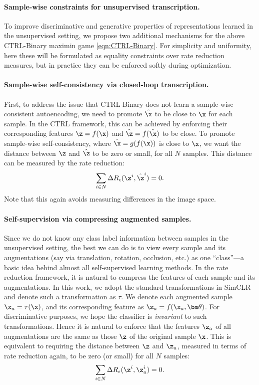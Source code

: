 \documentclass[../../book-main.tex]{subfiles}
\begin{document}
\paragraph{Sample-wise constraints for unsupervised transcription.}
\label{sec:constraints}
To improve discriminative and generative properties of
representations learned in the unsupervised setting, we propose two
additional mechanisms for the above CTRL-Binary maximin game
\eqref{eqn:CTRL-Binary}. For simplicity and uniformity, here these
will be formulated as equality constraints over rate reduction
measures, but in practice they can be enforced softly during optimization.

\paragraph{Sample-wise self-consistency via closed-loop transcription.}
First, to address the issue that CTRL-Binary does not learn a
sample-wise consistent autoencoding, we need to promote $\hat \x$ to
be close to $\x$ for each sample. In the CTRL framework, this can be
achieved by enforcing their corresponding features $\z=f(\x)$ and
$\hat \z = f(\hat \x)$ to be close.
To promote sample-wise self-consistency, where $\hat{\x} = g(f(\x))$
is close to $\x$, we want the distance between $\z$ and $\hat{\z}$
to be zero or small, for all $N$ samples.
This distance can be measured by the rate reduction:
\begin{align}
    \sum_{i\in N} \Delta R_\epsilon(\z^i,\hat{\z}^i) = 0.
    \label{eqn:sample-self-consistency}\vspace{-2mm}
\end{align}
Note that this again avoids measuring differences in the image space.

\paragraph{Self-supervision via compressing augmented samples.}
Since we do not know any class label information between samples in
the unsupervised setting, the best we can do is to view every sample
and its augmentations (say via translation, rotation, occlusion,
etc.) as one ``class''—a basic idea behind almost all self-supervised
learning methods. In the rate reduction framework, it is natural to
compress the features of each sample and its augmentations. In this
work, we adopt the standard transformations in SimCLR
\cite{chen2020simple} and denote such a transformation as $\tau$. We
denote each augmented sample $\x_a = \tau(\x)$, and its corresponding
feature as $\z_a = f(\x_a, \bm \theta)$. For discriminative
purposes, we hope the classifier is {\em invariant} to such
transformations. Hence it is natural to enforce that the features
$\z_a$ of all augmentations are the same as those $\z$ of the
original sample $\x$. This is equivalent to requiring the distance
between $\z$ and $\z_a$, measured in terms of rate reduction again,
to be zero (or small) for all $N$ samples:
\begin{align}
    \sum_{i\in N} \Delta R_\epsilon(\z^i,\z_{a}^i) = 0.
    \label{eqn:sample-compression}\vspace{-3mm}
\end{align}
\end{document}

